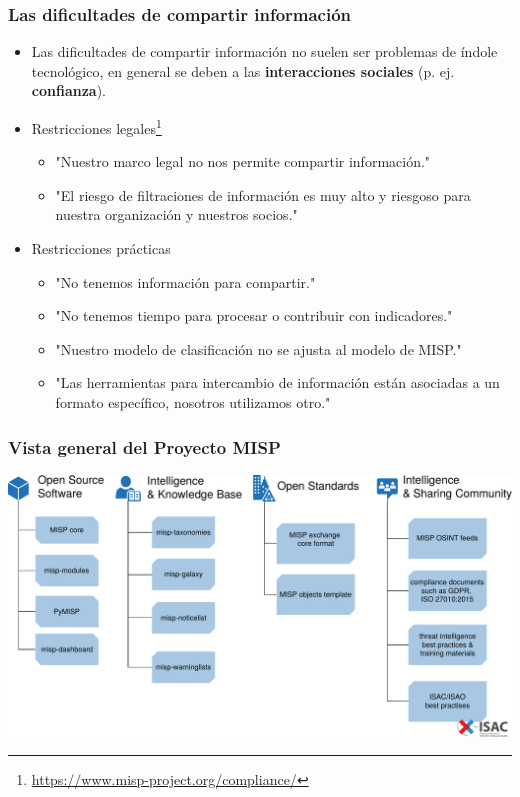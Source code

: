 \begin{frame}
\frametitle{Las dificultades de compartir información}
        \begin{itemize}
                \item Las dificultades de compartir información no suelen ser problemas de índole tecnológico, en general se deben a las {\bf interacciones sociales} (p. ej. {\bf confianza}).
                \item Restricciones legales\footnote{\url{https://www.misp-project.org/compliance/}}
                        \begin{itemize}
                                \item "Nuestro marco legal no nos permite compartir información."
                                \item "El riesgo de filtraciones de información es muy alto y riesgoso para nuestra organización y nuestros socios."
                        \end{itemize}
                \item Restricciones prácticas
                        \begin{itemize}
                                \item "No tenemos información para compartir."
                                \item "No tenemos tiempo para procesar o contribuir con indicadores."
                                \item "Nuestro modelo de clasificación no se ajusta al modelo de MISP."
                                \item "Las herramientas para intercambio de información están asociadas a un formato específico, nosotros utilizamos otro."
                        \end{itemize}
        \end{itemize}
\end{frame}


\begin{frame}
        \frametitle{Vista general del Proyecto MISP}
        \includegraphics[scale=0.35]{misp-overview-simplified.pdf}
\end{frame}

